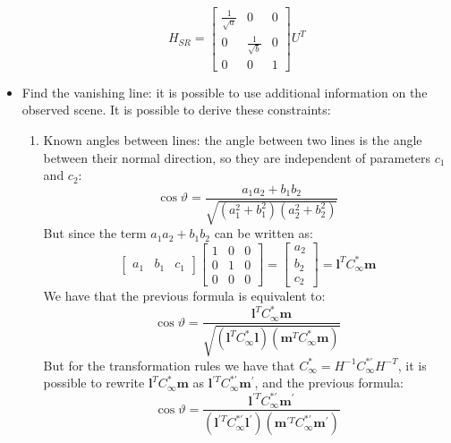 \documentclass[12pt, a4paper]{report}
\begin{document}
\begin{itemize}
            \[H_{SR}=
            \begin{bmatrix}
                \frac{1}{\sqrt{a}} & 0 & 0 \\
                0 & \frac{1}{\sqrt{b}} & 0 \\
                0 & 0 & 1
            \end{bmatrix}
            U^T
            \]
        \item Find the vanishing line: it is possible to use additional information on the observed scene. It is possible to derive these constraints: 
            \begin{enumerate}
                \item Known angles between lines: the angle between two lines is the angle between their normal direction, so they are independent of parameters 
                    $c_1$ and $c_2$: 
                    \[\cos\vartheta=\dfrac{a_1a_2+b_1b_2}{\sqrt{(a_1^2+b_1^2)(a_2^2+b_2^2)}}\]
                    But since the term $a_1a_2+b_1b_2$ can be written as: 
                    \[\begin{bmatrix}
                        a_1 & b_1 & c_1
                    \end{bmatrix}
                    \begin{bmatrix}
                        1 & 0 & 0 \\
                        0 & 1 & 0 \\
                        0 & 0 & 0
                    \end{bmatrix}
                    =
                    \begin{bmatrix}
                        a_2 \\ b_2 \\ c_2
                    \end{bmatrix}
                    =
                    \boldsymbol{l}^TC_{\infty}^{*}\boldsymbol{m}
                    \]
                    We have that the previous formula is equivalent to: 
                    \[\cos\vartheta=\dfrac{\boldsymbol{l}^TC_{\infty}^{*}\boldsymbol{m}}{\sqrt{(\boldsymbol{l}^TC_{\infty}^{*}\boldsymbol{l})(\boldsymbol{m}^TC_{\infty}^{*}\boldsymbol{m})}}\]
                    But for the transformation rules we have that $C_{\infty}^{*}=H^{-1}C_{\infty}^{*'}H^{-T}$, it is possible to rewrite $\boldsymbol{l}^TC_{\infty}^{*}\boldsymbol{m}$ as 
                    $\boldsymbol{l}^{'T}C_{\infty}^{*'}\boldsymbol{m}^{'}$, and the previous formula: 
                    \[\cos\vartheta=\dfrac{\boldsymbol{l}^{'T}C_{\infty}^{*'}\boldsymbol{m}^{'}}{(\boldsymbol{l}^{'T}C_{\infty}^{*'}\boldsymbol{l}^{'})(\boldsymbol{m}^{'T}C_{\infty}^{*'}\boldsymbol{m}^{'})}\]

\end{enumerate}
\end{itemize}
\end{document}
